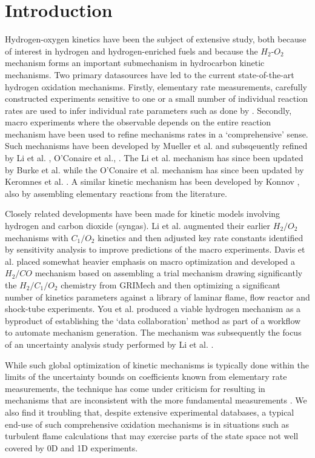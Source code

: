 \documentclass[preprint,3p,times,twocolumn]{elsarticle}
\begin{document}
\section{Introduction}
Hydrogen-oxygen kinetics have been the subject of extensive study, both
because of interest in hydrogen and hydrogen-enriched fuels and because
the $H_2$-$O_2$ mechanism forms an important submechanism in hydrocarbon
kinetic mechanisms. Two primary datasources have led to the current
state-of-the-art hydrogen oxidation mechanisms. Firstly, elementary rate
measurements, carefully constructed experiments sensitive to one or a
small number of individual reaction rates are used to infer individual
rate parameters such as done by \cite{MuellerYD98, AshmanH98}. Secondly,
macro experiments where the observable depends on the entire reaction
mechanism have been used to refine mechanisms rates in a `comprehensive'
sense. Such mechanisms have been developed by Mueller et al.
\cite{YetterDR91, MuellerKYD99} and subsqeuently refined by Li et al.
\cite{LiZKD04}, O'Conaire et al., \cite{OConaireCSPW04}. The Li et al.
mechanism has since been updated by Burke et al. \cite{BurkeCDJ10,
BurkeCJDK11} while the O'Conaire et al. mechanism has since been updated
by Keromnes et al. \cite{Keromnes_Many_Curran13}. A similar kinetic
mechanism has been developed by Konnov \cite{Konnov08}, also by
assembling elementary reactions from the literature.

Closely related developments have been made for kinetic models involving
hydrogen and carbon dioxide (syngas). Li et al. \cite{LiZKCDS07}
augmented their earlier $H_2/O_2$ mechanisms with $C_1/O_2$ kinetics and
then adjusted key rate constants identified by sensitivity analysis to
improve predictions of the macro experiments. Davis et al.
\cite{DavisJWE05} placed somewhat heavier emphasis on macro optimization
and developed a $H_2/CO$ mechanism based on assembling a trial mechanism
drawing significantly the $H_2/C_1/O_2$ chemistry from GRIMech
\cite{GRIMech} and then optimizing a significant number of kinetics
parameters against a library of laminar flame, flow reactor and
shock-tube experiments. You et al. \cite{YouPF11} produced a viable
hydrogen mechanism as a byproduct of establishing the `data
collaboration' method as part of a workflow to automate mechanism
generation. The mechanism was subsequently the focus of an uncertainty
analysis study performed by Li et al. \cite{LiYWL15}.  

While such global optimization of kinetic mechanisms is typically done
within the limits of the uncertainty bounds on coefficients known from
elementary rate measurements, the technique has come under criticism for
resulting in mechanisms that are inconsistent with the more fundamental
measurements \cite{DavisJWE05_comment}. We also find it troubling that, despite extensive
experimental databases, a typical end-use of such comprehensive oxidation mechanisms
is in situations such as turbulent flame calculations that may exercise parts of the 
state space not well covered by 0D and 1D experiments. 
\end{document}
